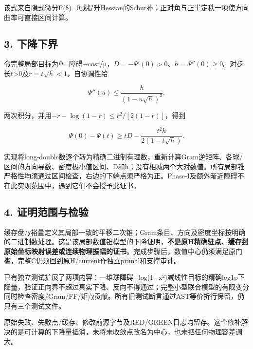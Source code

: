 \documentclass[
  10pt,
  a4paper,
]{article}
\begin{document}
该式来自隐式微分F(δ)=0或提升Hessian的Schur补；正对角与正半定秩一项使方向曲率可直接区间计算。

\subsection{3. 下降下界}\label{ux4e0bux964dux4e0bux754c}

令完整局部目标为Ψ=障碍−cost/μ，\(D=-\Psi'(0)>0\)、\(h=\Psi''(0)\ge0\)。对步长t\textgreater0及\(r=t\sqrt h<1\)，自协调性给

\[\Psi''(u)\le\frac{h}{(1-u\sqrt h)^2}.\]

两次积分，并用\(-r-\log(1-r)\le r^2/[2(1-r)]\)，得到

\[\boxed{\Psi(0)-\Psi(t)\ge tD-\frac{t^2h}{2(1-t\sqrt h)}.}\]

实现将long-double数逐个转为精确二进制有理数，重新计算Gram逆矩阵、各球/区间的方向导数、密度极小值区间、D和h；没有相减两个大对数值。所有局部锥严格性均须通过区间检查，右边的下端点须严格为正。Phase-I及额外渐近障碍不在此实现范围中，遇到它们不会授予此证书。

\subsection{4.
证明范围与检验}\label{ux8bc1ux660eux8303ux56f4ux4e0eux68c0ux9a8c}

缓存盘/χ裕量定义其局部一致的平移二次锥；Gram条目、方向及密度坐标按明确的二进制数处理。这是该局部数值锥模型的下降证明，\textbf{不是原H精确驻点、缓存到原始坐标映射误差或连续物理振幅的证书}。完成步骤后，数值中心仍须满足原门槛，完整C仍须回到原H/current作独立primal和支撑审计。

已有独立测试扩展了两项内容：一维球障碍−log(1−x²)减线性目标的精确log1p下降量，验证正向界不超过真实下降、反向不得通过；完整小型联合模型的有限变分同时检查密度/Gram/FF/矩/χ贡献。所有旧测试断言通过AST等价折行保留，仍只有三个测试文件。

原始失败、失败点/缓存、修改前源字节及RED/GREEN日志均留存。这个修补解决的是可计算的下降量抵消，未将未收敛点改名为中心，也未把任何物理容差调大。
\end{document}

